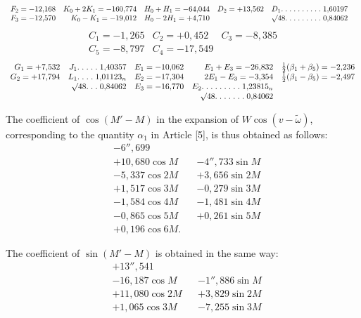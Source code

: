 \begin{landscape}
\[\begin{array}{rrrrrr}
F_2=-12{,}168&K_0+2K_1=-160{,}774&H_0+H_1=-64{,}044&D_2=+13{,}562&D_1\mathord{.}\mkern5mu\mathord{.}\mkern5mu\mathord{.}\mkern5mu\mathord{.}\mkern5mu\mathord{.}\mkern5mu\mathord{.}\mkern5mu\mathord{.}\mkern5mu\mathord{.}\mkern5mu\mathord{.}\mkern5mu\mathord{.}\mkern5mu1{,}60197&\\
F_3=-12{,}570&K_0-K_1=-19{,}012&H_0-2H_1=+4{,}710&&\mathord{{}^{}\!\surd}48\mathord{.}\mkern5mu\mathord{.}\mkern5mu\mathord{.}\mkern5mu\mathord{.}\mkern5mu\mathord{.}\mkern5mu\mathord{.}\mkern5mu\mathord{.}\mkern5mu\mathord{.}\mkern5mu\mathord{.}\mkern5mu0{,}84062&
\end{array}
\]
\[
\begin{array}{rrr}
C_1=-1{,}265&C_2=+0{,}452&C_3=-8{,}385\\
C_5=-8{,}797&C_4=-17{,}549&
\end{array}
\]
\[
\begin{array}{rrrrr}
G_1=+7{,}532&J_1\mathord{.}\mkern5mu\mathord{.}\mkern5mu\mathord{.}\mkern5mu\mathord{.}\mkern5mu\mathord{.}\mkern5mu1{,}40357&E_1=-10{,}062&E_1+E_3=-26{,}832&\frac12(\beta_1+\beta_5)=-2{,}236\\
G_2=+17{,}794&L_1\mathord{.}\mkern5mu\mathord{.}\mkern5mu\mathord{.}\mkern5mu\mathord{.}\mkern5mu1{,}01123_n&E_2=-17{,}304&2E_1-E_3=-3{,}354&\frac12(\beta_1-\beta_5)=-2{,}497\\
&\mathord{{}^{}\!\surd}48\mathord{.}\mkern5mu\mathord{.}\mkern5mu\mathord{.}\mkern5mu0{,}84062&E_3=-16{,}770&E_2\mathord{.}\mkern5mu\mathord{.}\mkern5mu\mathord{.}\mkern5mu\mathord{.}\mkern5mu\mathord{.}\mkern5mu\mathord{.}\mkern5mu\mathord{.}\mkern5mu\mathord{.}\mkern5mu\mathord{.}\mkern5mu1{,}23815_n&\\
&&&\mathord{{}^{}\!\surd}48\mathord{.}\mkern5mu\mathord{.}\mkern5mu\mathord{.}\mkern5mu\mathord{.}\mkern5mu\mathord{.}\mkern5mu\mathord{.}\mkern5mu\mathord{.}\mkern5mu0{,}84062&
\end{array}
\]
\par\noindent\hspace*{\parindent}The coefficient of \(\cos(M'-M)\) in the expansion of \(W\cos(v-\tilde\omega)\), corresponding to the quantity \(\alpha_1\) in Article [5], is thus obtained as follows:
\[
\begin{aligned}
&-6''{,}699\\
&+10{,}680\cos M&&-4''{,}733\sin M\\
&-5{,}337\cos2M&&+3{,}656\sin2M\\
&+1{,}517\cos3M&&-0{,}279\sin3M\\
&-1{,}584\cos4M&&-1{,}481\sin4M\\
&-0{,}865\cos5M&&+0{,}261\sin5M\\
&+0{,}196\cos6M.
\end{aligned}
\]
\par\noindent The coefficient of \(\sin(M'-M)\) is obtained in the same way:
\[
\begin{aligned}
&+13''{,}541\\
&-16{,}187\cos M&&-1''{,}886\sin M\\
&+11{,}080\cos2M&&+3{,}829\sin2M\\
&+1{,}065\cos3M&&-7{,}255\sin3M\\

\end{aligned}\]
\end{landscape}
